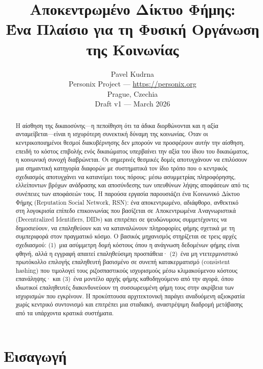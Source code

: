 \documentclass[11pt,a4paper,twocolumn]{article}
\title{\textbf{Αποκεντρωμένο Δίκτυο Φήμης:\\Ένα Πλαίσιο για τη Φυσική Οργάνωση της Κοινωνίας}}
\author{Pavel Kudrna\\Personix Project --- \url{https://personix.org}\\Prague, Czechia\\Draft v1 --- March 2026}
\date{}
\begin{document}
\maketitle

\begin{abstract}
Η αίσθηση της δικαιοσύνης---η πεποίθηση ότι τα άδικα διορθώνονται και η αξία ανταμείβεται---είναι η ισχυρότερη συνεκτική δύναμη της κοινωνίας. Όταν οι κεντρικοποιημένοι θεσμοί διακυβέρνησης δεν μπορούν να προσφέρουν αυτήν την αίσθηση, επειδή το κόστος επιβολής ενός δικαιώματος υπερβαίνει την αξία του ίδιου του δικαιώματος, η κοινωνική συνοχή διαβρώνεται. Οι σημερινές θεσμικές δομές αποτυγχάνουν να επιλύσουν μια σημαντική κατηγορία διαφορών με συστηματικά τον ίδιο τρόπο που ο κεντρικός σχεδιασμός αποτυγχάνει να κατανείμει τους πόρους: μέσω ασυμμετρίας πληροφόρησης, ελλείποντων βρόχων ανάδρασης και αποσύνδεσης των υπευθύνων λήψης αποφάσεων από τις συνέπειες των αποφάσεών τους. Η παρούσα εργασία παρουσιάζει ένα Κοινωνικό Δίκτυο Φήμης (Reputation Social Network, RSN): ένα αποκεντρωμένο, αδιάφθορο, ανθεκτικό στη λογοκρισία επίπεδο επικοινωνίας που βασίζεται σε Αποκεντρωμένα Αναγνωριστικά (Decentralized Identifiers, DIDs) και επιτρέπει σε ψευδώνυμους συμμετέχοντες να δημοσιεύουν, να επαληθεύουν και να καταναλώνουν πληροφορίες φήμης σχετικά με τη συμπεριφορά στον πραγματικό κόσμο. Ο βασικός μηχανισμός στηρίζεται σε τρεις αρχές σχεδιασμού: (1)~μια ασύμμετρη δομή κόστους όπου η ανάγνωση δεδομένων φήμης είναι φθηνή, αλλά η εγγραφή απαιτεί επαληθεύσιμη προσπάθεια· (2)~ένα μη ντετερμινιστικό πρωτόκολλο επιλογής επαληθευτή βασισμένο σε συνεπή κατακερματισμό (consistent hashing) που τιμολογεί τους ριζοσπαστικούς ισχυρισμούς μέσω κλιμακούμενου κόστους επανάληψης· και (3)~ένα μοντέλο αρχής φήμης καθοδηγούμενο από την αγορά, όπου ιδιωτικοί επαληθευτές διακινδυνεύουν τη συσσωρευμένη φήμη τους στην ακρίβεια των ισχυρισμών που εγκρίνουν. Η προκύπτουσα αρχιτεκτονική παράγει αναδυόμενη αξιοκρατία χωρίς κεντρικό συντονισμό και επιτρέπει μια σταδιακή, αναστρέψιμη διαδρομή μετάβασης από τα υπάρχοντα κρατικά συστήματα.
\end{abstract}

\section{Εισαγωγή}
\end{document}
